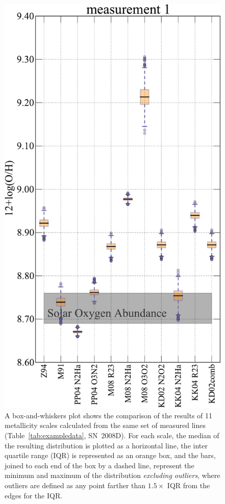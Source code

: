 \documentclass{emulateapj}
\begin{document}
\begin{figure}[ht!]
  \includegraphics[width=0.95\columnwidth]{exampledata_boxplot2000_m1.pdf}
   \caption{A box-and-whiskers plot shows the comparison of the results of 11 metallicity scales calculated from the same set of measured lines (Table~\ref{tab:exampledata}, SN~2008D). For each scale, the median of the resulting distribution is plotted as a horizontal line, the inter quartile range (IQR) is represented as an orange box, and the bars, joined to each end of the box by a dashed line, represent the minimum and maximum of the distribution \emph{excluding outliers}, where outliers are defined as any point farther than $1.5\times$ IQR from the edges for the IQR.}
 \label{boxplot}
\end{figure}
\end{document}
